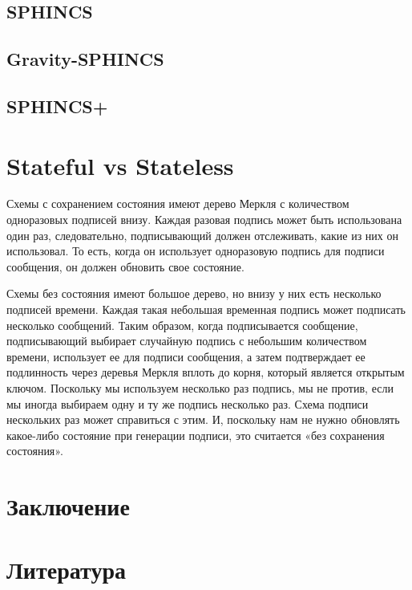 \documentclass[a4paper, 14pt]{extarticle}
\begin{document}
\subsection{SPHINCS}
\subsection{Gravity-SPHINCS}
\subsection{SPHINCS+}

\section{Stateful vs Stateless}
Схемы с сохранением состояния имеют дерево Меркля с количеством одноразовых подписей внизу. Каждая разовая подпись может быть использована один раз, следовательно, подписывающий должен отслеживать, какие из них он использовал. То есть, когда он использует одноразовую подпись для подписи сообщения, он должен обновить свое состояние.

Схемы без состояния имеют большое дерево, но внизу у них есть несколько подписей времени. Каждая такая небольшая временная подпись может подписать несколько сообщений. Таким образом, когда подписывается сообщение, подписывающий выбирает случайную подпись с небольшим количеством времени, использует ее для подписи сообщения, а затем подтверждает ее подлинность через деревья Меркля вплоть до корня, который является открытым ключом. Поскольку мы используем несколько раз подпись, мы не против, если мы иногда выбираем одну и ту же подпись несколько раз. Схема подписи нескольких раз может справиться с этим. И, поскольку нам не нужно обновлять какое-либо состояние при генерации подписи, это считается «без сохранения состояния».
\newpage

\section{Заключение}
\newpage

\section{Литература}
\newpage
\end{document}
